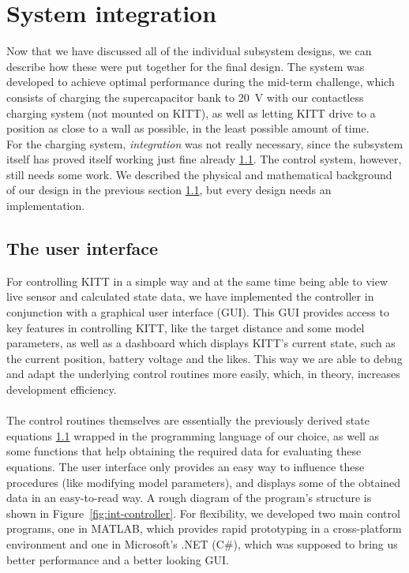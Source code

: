 \documentclass[11pt,titlepage]{report}
\begin{document}
\chapter{System integration}
Now that we have discussed all of the individual subsystem designs, we can describe how these were put together for the final design. The system was developed to achieve optimal performance during the mid-term challenge, which consists of charging the supercapacitor bank to \SI{20}{V} with our contactless charging system (not mounted on KITT), as well as letting KITT drive to a position as close to a wall as possible, in the least possible amount of time. \\
For the charging system, \textit{integration} was not really necessary, since the subsystem itself has proved itself working just fine already \ref{}. The control system, however, still needs some work. We described the physical and mathematical background of our design in the previous section \ref{}, but every design needs an implementation.

\section{The user interface}
For controlling KITT in a simple way and at the same time being able to view live sensor and calculated state data, we have implemented the controller in conjunction with a graphical user interface (GUI). This GUI provides access to key features in controlling KITT, like the target distance and some model parameters, as well as a dashboard which displays KITT's current state, such as the current position, battery voltage and the likes. This way we are able to debug and adapt the underlying control routines more easily, which, in theory, increases development efficiency.
\\\\
The control routines themselves are essentially the previously derived state equations \ref{} wrapped in the programming language of our choice, as well as some functions that help obtaining the required data for evaluating these equations. The user interface only provides an easy way to influence these procedures (like modifying model parameters), and displays some of the obtained data in an easy-to-read way. A rough diagram of the program's structure is shown in Figure~\ref{fig:int-controller}. For flexibility, we developed two main control programs, one in MATLAB, which provides rapid prototyping in a cross-platform environment and one in Microsoft's .NET (C\#), which was supposed to bring us better performance and a better looking GUI.
\end{document}
